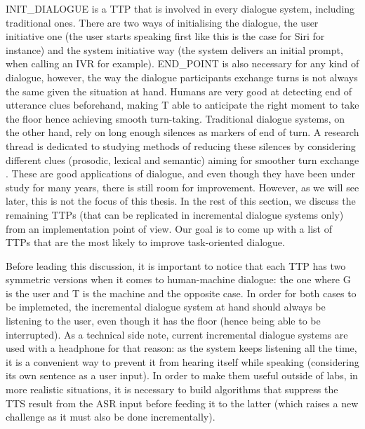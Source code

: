           INIT\_DIALOGUE is a TTP that is involved in every dialogue system, including traditional ones. There are two ways of initialising the dialogue, the user initiative one (the user starts speaking first like this is the case for Siri for instance) and the system initiative way (the system delivers an initial prompt, when calling an IVR for example). END\_POINT is also necessary for any kind of dialogue, however, the way the dialogue participants exchange turns is not always the same given the situation at hand. Humans are very good at detecting end of utterance clues beforehand, making T able to anticipate the right moment to take the floor hence achieving smooth turn-taking. Traditional dialogue systems, on the other hand, rely on long enough silences as markers of end of turn. A research thread is dedicated to studying methods of reducing these silences by considering different clues (prosodic, lexical and semantic) aiming for smoother turn exchange \cite{Raux2008}. These are good applications of dialogue, and even though they have been under study for many years, there is still room for improvement. However, as we will see later, this is not the focus of this thesis. In the rest of this section, we discuss the remaining TTPs (that can be replicated in incremental dialogue systems only) from an implementation point of view. Our goal is to come up with a list of TTPs that are the most likely to improve task-oriented dialogue.

          Before leading this discussion, it is important to notice that each TTP has two symmetric versions when it comes to human-machine dialogue: the one where G is the user and T is the machine and the opposite case. In order for both cases to be implemeted, the incremental dialogue system at hand should always be listening to the user, even though it has the floor (hence being able to be interrupted). As a technical side note, current incremental dialogue systems are used with a headphone for that reason: as the system keeps listening all the time, it is a convenient way to prevent it from hearing itself while speaking (considering its own sentence as a user input). In order to make them useful outside of labs, in more realistic situations, it is necessary to build algorithms that suppress the TTS result from the ASR input before feeding it to the latter (which raises a new challenge as it must also be done incrementally).
